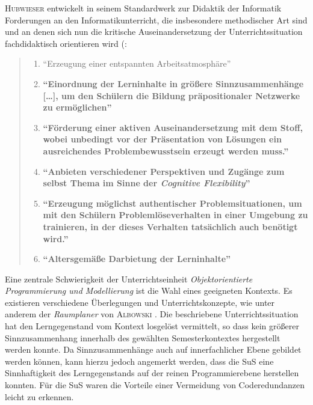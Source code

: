 \documentclass[paper=a4, DIV=13, BCOR=12mm, twoside=on, onecolumn=on, open = any, titlepage =on, parskip =half-, headsepline = on, footsepline = on, chapterprefix = on, sectionprefix = on, appendixprefix = off, fontsize = 12pt, numbers = noenddot, abstract = off]{scrreprt}
\begin{document}
\textsc{Hubwieser} entwickelt in seinem Standardwerk zur Didaktik der Informatik Forderungen an den Informatikunterricht, die insbesondere methodischer Art sind und an denen sich nun die kritische Auseinandersetzung der Unterrichtssituation fachdidaktisch orientieren wird (\cite[S.67]{hubwieser:07}:
\begin{quote}
\begin{enumerate}
\item "`Erzeugung einer entspannten Arbeitsatmosphäre"'
\item\textbf{ "`Einordnung der Lerninhalte in größere Sinnzusammenhänge […], um den Schülern die Bildung präpositionaler Netzwerke zu ermöglichen"'}
\item \textbf{"`Förderung einer aktiven Auseinandersetzung mit dem Stoff, wobei unbedingt vor der Präsentation von Lösungen ein ausreichendes Problembewusstsein erzeugt werden muss."'}
\item \textbf{"`Anbieten verschiedener Perspektiven und Zugänge zum selbst Thema im Sinne der \emph{Cognitive Flexibility}"'}
\item \textbf{ "`Erzeugung möglichst authentischer Problemsituationen, um mit den Schülern Problemlöseverhalten in einer Umgebung zu trainieren, in der dieses Verhalten tatsächlich auch benötigt wird."'}
\item \textbf{"`Altersgemäße Darbietung der Lerninhalte"'}
\end{enumerate}
\end{quote}


\onehalfspacing

Eine zentrale Schwierigkeit der Unterrichtseinheit \emph{Objektorientierte Programmierung und Modellierung} ist die Wahl eines geeigneten Kontexts. Es existieren verschiedene Überlegungen und Unterrichtskonzepte, wie unter anderem der \emph{Raumplaner} von \textsc{Albowski} \cite{albowski}. Die beschriebene Unterrichtssituation hat den Lerngegenstand vom Kontext losgelöst vermittelt, so dass kein größerer Sinnzusammenhang innerhalb des gewählten Semesterkontextes hergestellt werden konnte. Da Sinnzusammenhänge auch auf innerfachlicher Ebene gebildet werden können, kann hierzu jedoch angemerkt werden, dass die SuS eine Sinnhaftigkeit des Lerngegenstands auf der reinen Programmierebene herstellen konnten. Für die SuS waren die Vorteile einer Vermeidung von Coderedundanzen leicht zu erkennen. 
\end{document}
